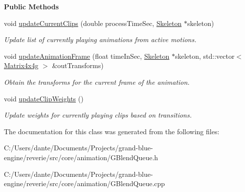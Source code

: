 \begin{Indent}\textbf{ Public Methods}\par
\begin{DoxyCompactItemize}
\item 
\mbox{\label{classrev_1_1_blend_queue_aa06c35e28ab17cd33a09433d37343f00}} 
void \mbox{\hyperlink{classrev_1_1_blend_queue_aa06c35e28ab17cd33a09433d37343f00}{update\+Current\+Clips}} (double process\+Time\+Sec, \mbox{\hyperlink{classrev_1_1_skeleton}{Skeleton}} $\ast$skeleton)
\begin{DoxyCompactList}\small\item\em Update list of currently playing animations from active motions. \end{DoxyCompactList}\item 
\mbox{\label{classrev_1_1_blend_queue_ae0857a69ff1dda27abb4e52ece6541da}} 
void \mbox{\hyperlink{classrev_1_1_blend_queue_ae0857a69ff1dda27abb4e52ece6541da}{update\+Animation\+Frame}} (float time\+In\+Sec, \mbox{\hyperlink{classrev_1_1_skeleton}{Skeleton}} $\ast$skeleton, std\+::vector$<$ \mbox{\hyperlink{classrev_1_1_square_matrix}{Matrix4x4g}} $>$ \&out\+Transforms)
\begin{DoxyCompactList}\small\item\em Obtain the transforms for the current frame of the animation. \end{DoxyCompactList}\item 
\mbox{\label{classrev_1_1_blend_queue_ac9f8fce7996800d26a1f29d6a272bebe}} 
void \mbox{\hyperlink{classrev_1_1_blend_queue_ac9f8fce7996800d26a1f29d6a272bebe}{update\+Clip\+Weights}} ()
\begin{DoxyCompactList}\small\item\em Update weights for currently playing clips based on transitions. \end{DoxyCompactList}\end{DoxyCompactItemize}
\end{Indent}


The documentation for this class was generated from the following files\+:\begin{DoxyCompactItemize}
\item 
C\+:/\+Users/dante/\+Documents/\+Projects/grand-\/blue-\/engine/reverie/src/core/animation/G\+Blend\+Queue.\+h\item 
C\+:/\+Users/dante/\+Documents/\+Projects/grand-\/blue-\/engine/reverie/src/core/animation/G\+Blend\+Queue.\+cpp\end{DoxyCompactItemize}
